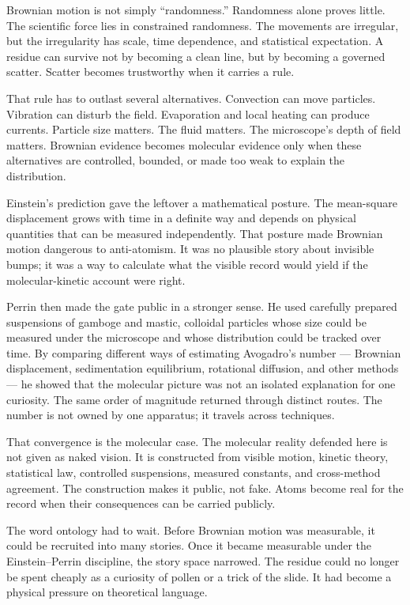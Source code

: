 Brownian motion is not simply ``randomness.'' Randomness alone proves
little. The scientific force lies in constrained randomness. The
movements are irregular, but the irregularity has scale, time dependence,
and statistical expectation. A residue can survive not by becoming a
clean line, but by becoming a governed scatter. Scatter becomes
trustworthy when it carries a rule.

That rule has to outlast several alternatives. Convection can move
particles. Vibration can disturb the field. Evaporation and local heating
can produce currents. Particle size matters. The fluid matters. The
microscope's depth of field matters. Brownian evidence becomes molecular
evidence only when these alternatives are controlled, bounded, or made
too weak to explain the distribution.

Einstein's prediction gave the leftover a mathematical posture. The
mean-square displacement grows with time in a definite way and depends on
physical quantities that can be measured independently. That posture made
Brownian motion dangerous to anti-atomism. It was no plausible story
about invisible bumps; it was a way to calculate what the visible record
would yield if the molecular-kinetic account were right.

Perrin then made the gate public in a stronger sense. He used carefully
prepared suspensions of gamboge and mastic, colloidal particles whose
size could be measured under the microscope and whose distribution could
be tracked over time. By comparing different ways of estimating
Avogadro's number --- Brownian displacement, sedimentation equilibrium,
rotational diffusion, and other methods --- he showed that the molecular
picture was not an isolated explanation for one curiosity. The same
order of magnitude returned through distinct routes. The number is not
owned by one apparatus; it travels across techniques.

That convergence is the molecular case. The molecular reality defended
here is not given as naked vision. It is constructed from visible motion,
kinetic theory, statistical law, controlled suspensions, measured
constants, and cross-method agreement. The construction makes it public,
not fake. Atoms become real for the record when their consequences can
be carried publicly.

The word ontology had to wait. Before Brownian motion was measurable, it
could be recruited into many stories. Once it became measurable under the
Einstein--Perrin discipline, the story space narrowed. The residue could
no longer be spent cheaply as a curiosity of pollen or a trick of the
slide. It had become a physical pressure on theoretical language.

